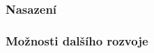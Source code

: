 \subsubsection*{Nasazení}\label{nasazeni}

\subsubsection*{Možnosti dalšího rozvoje}\label{moznosti-dalsiho-rozvoje}

